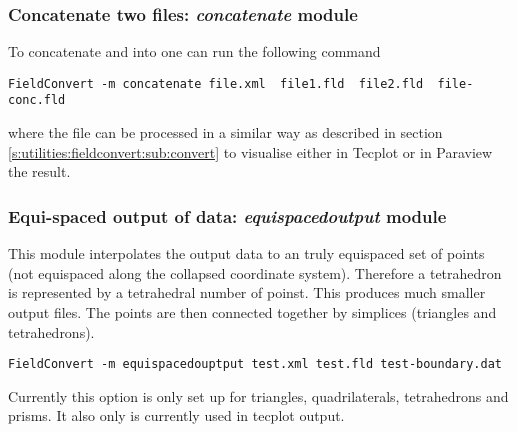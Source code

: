 \subsubsection{Concatenate two files: \textit{concatenate} module}
To concatenate  and  into 
one can run the following command
%
\begin{lstlisting}[style=BashInputStyle]
FieldConvert -m concatenate file.xml  file1.fld  file2.fld  file-conc.fld
\end{lstlisting}
%
where the file  can be processed in a similar 
way as described in section \ref{s:utilities:fieldconvert:sub:convert}
to visualise either in Tecplot or in Paraview the result.
%
%
%
\subsubsection{Equi-spaced output of data: \textit{equispacedoutput} module}
This module interpolates the output data to an truly equispaced set of
points (not equispaced along the collapsed coordinate
system). Therefore a tetrahedron is represented by a tetrahedral
number of poinst. This produces much smaller output files. The points
are then connected together by simplices (triangles and tetrahedrons).

\begin{lstlisting}[style=BashInputStyle]
FieldConvert -m equispacedouptput test.xml test.fld test-boundary.dat
\end{lstlisting}


\begin{notebox} 
Currently this option is only set up for triangles, quadrilaterals,
tetrahedrons and prisms. It also only is currently used in tecplot
output.
\end{notebox}

